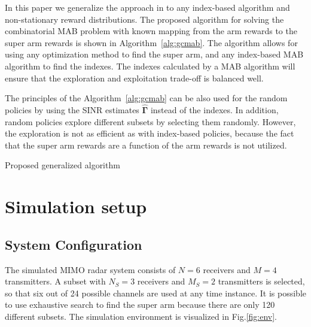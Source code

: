 \documentclass[conference]{IEEEtran}
\newcommand{\vsinrb}{\widehat{\boldsymbol{\Gamma}}}
\begin{document}
In this paper we generalize the approach in \cite{MAB_subset_selection} to any index-based algorithm and non-stationary reward distributions. 
The proposed algorithm for solving the combinatorial MAB problem with known mapping from the arm rewards to the super arm rewards is shown in Algorithm~\ref{alg:gcmab}.
The algorithm allows for using any optimization method to find the super arm, and any index-based MAB algorithm to find the indexes.
The indexes calculated by a MAB algorithm will ensure that the exploration and exploitation trade-off is balanced well.

The principles of the Algorithm~\ref{alg:gcmab} can be also used for the random policies by using the SINR estimates $\vsinrb$ instead of the indexes.
In addition, random policies explore different subsets by selecting them randomly.
However, the exploration is not as efficient as with index-based policies, because the fact that the super arm rewards are a function of the arm rewards is not utilized.

\begin{algorithm}[h]
\SetAlgoLined
{}
\caption{Proposed generalized algorithm}
\label{alg:gcmab}
\end{algorithm}

\section{Simulation setup}
\label{sec:sim}


\subsection{System Configuration}
\label{seq:sys_conf}
The simulated MIMO radar system consists of $N=6$ receivers and $M=4$ transmitters.
A subset with $N_S=3$ receivers and $M_S=2$ transmitters is selected, so that six out of 24 possible channels are used at any time instance.
It is possible to use exhaustive search to find the super arm because there are only 120 different subsets.
The simulation environment is visualized in Fig.\ref{fig:env}.
\end{document}
